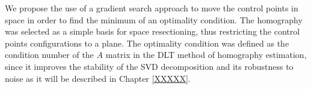 \documentclass[letterpaper, 10 pt, conference]{ieeeconf}  %
\begin{document}
We propose the use of a gradient search approach to move the control points in space in order to find the minimum of an optimality condition. The homography was selected as a simple basis for space resectioning, thus restricting the control points configurations to a plane. The optimality condition was defined as the condition number of the $A$ matrix in the DLT method of homography estimation, since it improves the stability of the SVD decomposition and its robustness to noise as it will be described in Chapter \ref{XXXXX}.










\end{document}
